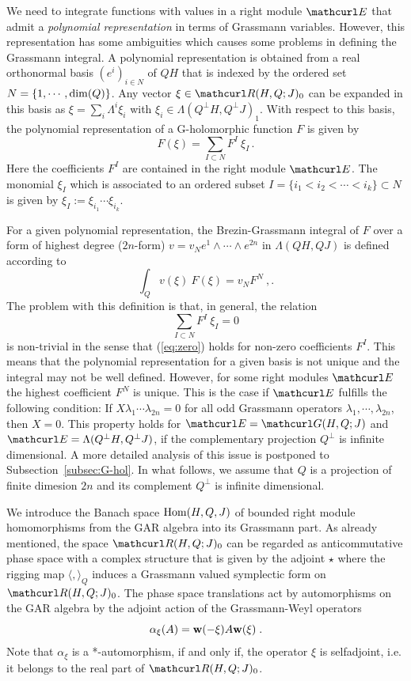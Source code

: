 \documentclass[pra,twoside,amsmath,amsfonts,amssymb,superscriptaddress,showpacs]{revtex4}
\def\1#1{{\bf #1}}
\def\8#1{{\rm #1}}
\def\9#1{{\mathcurl #1}}
\newcommand{\RIGG}[3]{{\langle}{#1},{#2}{\rangle}_{#3}}
\newcommand{\GR}[2]{\Lambda(#1,#2)}
\newcommand{\GAR}[3]{\9G(#1,#3;#2)}
\newcommand{\PHSP}[3]{\9R(#1,#3;#2)}
\newcommand{\ADJ}{\star}
\newcommand{\RGHOM}[3]{{\rm Hom}(#1,#3,#2)}
\begin{document}
We need to integrate functions with values in a right module $\9E$ that admit a {\em polynomial
representation} in terms of Grassmann variables. However, this
representation has some ambiguities which causes some problems in defining the Grassmann integral.
A polynomial representation is obtained from a real orthonormal basis $(e^i)_{i\in N}$ of $QH$
that is indexed by the ordered set $N=\{1,\cdots,\8{dim}(Q)\}$. Any vector $\xi\in\PHSP{H}{J}{Q}_0$
can be expanded in this basis as $\xi=\sum_i\Lambda^i\xi_i$ with $\xi_i\in\GR{Q^\perp H}{Q^\perp
J}_1$. With respect to this basis, the polynomial representation of a G-holomorphic function $F$ is
given by 
\begin{equation}
F(\xi)=\sum_{I\subset N} F^I \ \xi_I \, .
\end{equation}
Here the coefficients $F^I$ are contained in the right module $\9E$. The monomial $\xi_I$ which is
associated to an
ordered subset $I=\{i_1<i_2<\cdots<i_k\}\subset N$ is given by $\xi_I:=\xi_{i_1}\cdots\xi_{i_k}$.

For a given polynomial representation, the Brezin-Grassmann integral of $F$ over a form of highest
degree ($2n$-form) $v=v_N e^1\wedge\cdots\wedge e^{2n}$ in $\GR{QH}{QJ}$ is defined according to
\begin{equation}
\int_Q v(\xi) \ F(\xi)=v_{N} F^{N} \ , .
\end{equation}
The problem with this definition is that, in general, the relation 
\begin{equation}
\label{eq:zero}
\sum_{I\subset N} F^I \ \xi_I=0
\end{equation}
is non-trivial in the sense that (\ref{eq:zero}) holds for non-zero coefficients $F^I$. This means
that the polynomial representation for a given basis is not unique and the integral may not be
well defined. However, for some right modules $\9E$ the highest coefficient $F^N$ is unique. This
is the case if $\9E$ fulfills the following condition: If $X\lambda_1\cdots\lambda_{2n}=0$ for
all odd Grassmann operators $\lambda_1,\cdots,\lambda_{2n}$, then $X=0$. This property holds for
$\9E=\GAR{H}{J}{Q}$ and $\9E=\GR{Q^\perp H}{Q^\perp J}$, if the complementary projection $Q^\perp$
is infinite dimensional. A more detailed analysis of this issue is postponed to
Subsection~\ref{subsec:G-hol}. In what follows, we assume that $Q$ is a projection of finite
dimesion $2n$ and its complement $Q^\perp$ is infinite dimensional. 

We introduce the Banach space $\RGHOM{H}{J}{Q}$ of bounded right module homomorphisms from
the GAR algebra into its Grassmann part. As already mentioned, the space $\PHSP{H}{J}{Q}_0$ can be
regarded as anticommutative phase space with a complex structure that is given by the adjoint $\ADJ$
where the rigging map $\RIGG{}{}{Q}$ induces a Grassmann valued symplectic form on
$\PHSP{H}{J}{Q}_0$. The phase space translations act by automorphisms on the GAR algebra by the
adjoint action of the Grassmann-Weyl operators 
\begin{equation}
\alpha_\xi(A)=\1w(-\xi)A\1w(\xi) \; .
\end{equation}
Note that $\alpha_\xi$ is a *-automorphism, if and only if, the
operator $\xi$ is selfadjoint, i.e. it belongs to the real part of $\PHSP{H}{J}{Q}_0$.
\end{document}
